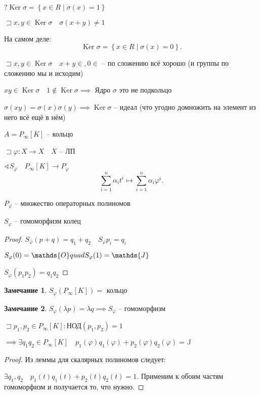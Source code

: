 \documentclass{book}
\DeclareMathOperator{\Ker}{Ker}
\theoremstyle{definition}
\newtheorem*{note}{Замечание}
\begin{document}
?$\Ker \sigma = \left\{ x\in R\mid \sigma(x) = 1 \right\} $ 

$\sqsupset x,y \in \Ker \sigma\quad \sigma(x+y)\neq 1$

На самом деле:
\[
    \Ker \sigma = \left\{ x\in R\mid \sigma(x) = 0  \right\} 
.\] 

$\sqsupset x,y\in \Ker \sigma\quad x+y\in, 0\in $ -- по сложению всё хорошо (и группы по сложению мы и исходим)

$xy\in \Ker\sigma\quad 1\not\in \Ker\sigma \implies $ Ядро $\sigma$ это не подкольцо

$\sigma\left( xy \right)  = \sigma(x)\sigma(y) \implies \Ker\sigma$ -- идеал (что угодно домножить на элемент из него всё ещё в нём)

$A = P_{\infty }[K]$ -- кольцо

$\sqsupset \varphi:X \to X\quad X$ -- ЛП

$\sphericalangle S_{\varphi}\quad P_{\infty }[K] \to P_{\varphi}$
 \[
 \sum_{i=1}^{n} \alpha_it^i \longmapsto \sum_{i=1}^{n} \alpha_i\varphi^i
 .\] 

 \begin{definition}
     $P_{\varphi}$ -- множество операторных полиномов
 \end{definition}

 \begin{lemma}
     $S_{\varphi}$ -- гомоморфизм колец
 \end{lemma}
 \begin{proof}
     $S_{\varphi}\left( p+q \right)  = q_1+q_2\quad S_{\varphi}p_i = q_i$

     $S_{\varphi}(0) =\mathds{O}\\quad S_{\varphi}(1) = \mathds{J}$ 

     $S_{\varphi}\left( p_1p_2 \right) =q_1q_2$
 \end{proof}
\begin{note}
    $S_{\varphi}\left( P_{\infty }[K] \right) =$ кольцо
\end{note}

\begin{note}
    $S_{\varphi} \left( \lambda p \right)  = \lambda q \implies  S_{\varphi}$ -- гомоморфизм
\end{note}

\begin{theorem}
    $\sqsupset p_1,p_2\in P_{\infty }[K]: \text{НОД}\left( p_1,p_2 \right)  = 1$ 

    $\implies \exists q_1q_2\in P_{\infty }[K]\quad p_1(\varphi)q_1(\varphi) + p_2\left( \varphi \right) q_2\left( \varphi \right) = \mathds{J}$
\end{theorem}
\begin{proof}
    Из леммы для скалярных полиномов следует:

    $\exists q_1, q_2\quad p_1(t)q_1(t) + p_2(t)q_2(t) = 1$. Применим к обоим частям гомоморфизм и получается то, что нужно.
\end{proof}
\end{document}

